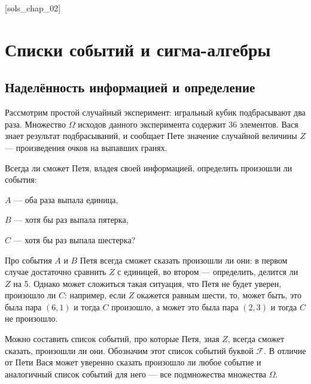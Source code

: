 \documentclass[pdftex, 12pt, a4paper]{article}
\def\F{\ensuremath{\mathcal{F}}} %
\def \Om{\Omega}
\theoremstyle{definition} %
\numberwithin{problem}{section}
\numberwithin{blits}{section}
\begin{document}
[sols_chap_02]





\section{Списки событий и сигма-алгебры}

\subsection{Наделённость информацией и определение}

Рассмотрим простой случайный эксперимент: игральный кубик подбрасывают два раза. Множество $\Om$ исходов данного эксперимента содержит $36$ элементов. Вася знает результат подбрасываний, и сообщает Пете значение случайной величины $Z$ --- произведения очков на выпавших гранях.

Всегда ли сможет Петя, владея своей информацией, определить произошли ли события:

$A$ --- оба раза выпала единица,

$B$ --- хотя бы раз выпала пятерка,

$C$ --- хотя бы раз выпала шестерка?

Про события $A$ и $B$ Петя всегда сможет сказать произошли ли они: в первом случае достаточно сравнить $Z$ с единицей, во втором --- определить, делится ли $Z$ на 5. Однако может сложиться такая ситуация, что Петя не будет уверен, произошло ли $C$: например, если $Z$ окажется равным шести, то, может быть, это была пара $(6,1)$ и тогда $C$ произошло, а может это была пара $(2,3)$ и тогда $C$ не произошло.

Можно составить список событий, про которые Петя, зная $Z$, всегда сможет сказать, произошли ли они. Обозначим этот список событий буквой $\F$. В отличие от Пети Вася может уверенно сказать произошло ли любое событие и аналогичный список событий для него --- все подмножества множества $\Om$.
\end{document}
